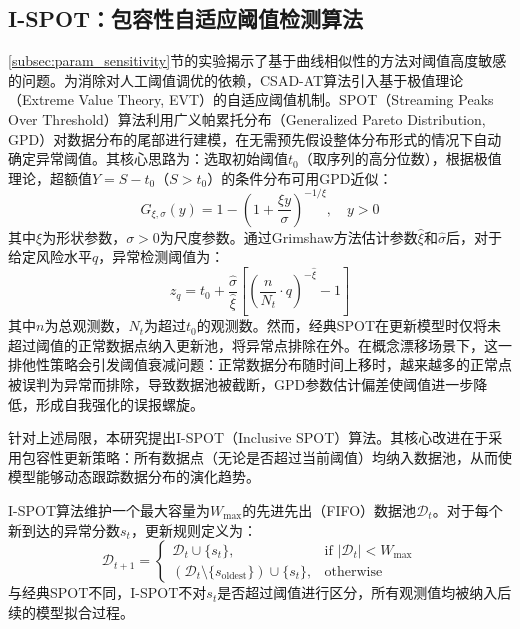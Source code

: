 \subsection{I-SPOT：包容性自适应阈值检测算法}\label{sec:threshold}

\ref{subsec:param_sensitivity}节的实验揭示了基于曲线相似性的方法对阈值高度敏感的问题。为消除对人工阈值调优的依赖，CSAD-AT算法引入基于极值理论（Extreme Value Theory, EVT）的自适应阈值机制。SPOT（Streaming Peaks Over Threshold）\cite{siffer2017spot}算法利用广义帕累托分布（Generalized Pareto Distribution, GPD）对数据分布的尾部进行建模，在无需预先假设整体分布形式的情况下自动确定异常阈值。其核心思路为：选取初始阈值$t_0$（取序列的高分位数），根据极值理论，超额值$Y = S - t_0$（$S > t_0$）的条件分布可用GPD近似：
\begin{equation}
    G_{\xi,\sigma}(y) = 1 - \left(1 + \frac{\xi y}{\sigma}\right)^{-1/\xi}, \quad y > 0
\end{equation}
其中$\xi$为形状参数，$\sigma > 0$为尺度参数。通过Grimshaw方法估计参数$\hat{\xi}$和$\hat{\sigma}$后，对于给定风险水平$q$，异常检测阈值为：
\begin{equation}\label{eq:spot_threshold}
    z_q = t_0 + \frac{\hat{\sigma}}{\hat{\xi}}\left[\left(\frac{n}{N_t} \cdot q\right)^{-\hat{\xi}} - 1\right]
\end{equation}
其中$n$为总观测数，$N_t$为超过$t_0$的观测数。然而，经典SPOT在更新模型时仅将未超过阈值的正常数据点纳入更新池，将异常点排除在外。在概念漂移场景下，这一排他性策略会引发阈值衰减问题：正常数据分布随时间上移时，越来越多的正常点被误判为异常而排除，导致数据池被截断，GPD参数估计偏差使阈值进一步降低，形成自我强化的误报螺旋。

针对上述局限，本研究提出I-SPOT（Inclusive SPOT）算法。其核心改进在于采用包容性更新策略：所有数据点（无论是否超过当前阈值）均纳入数据池，从而使模型能够动态跟踪数据分布的演化趋势。

I-SPOT算法维护一个最大容量为$W_{\max}$的先进先出（FIFO）数据池$\mathcal{D}_t$。对于每个新到达的异常分数$s_t$，更新规则定义为：
\begin{equation}
    \mathcal{D}_{t+1} = \begin{cases}
        \mathcal{D}_t \cup \{s_t\}, & \text{if } |\mathcal{D}_t| < W_{\max} \\
        (\mathcal{D}_t \setminus \{s_{\text{oldest}}\}) \cup \{s_t\}, & \text{otherwise}
    \end{cases}
\end{equation}
与经典SPOT不同，I-SPOT不对$s_t$是否超过阈值进行区分，所有观测值均被纳入后续的模型拟合过程。

